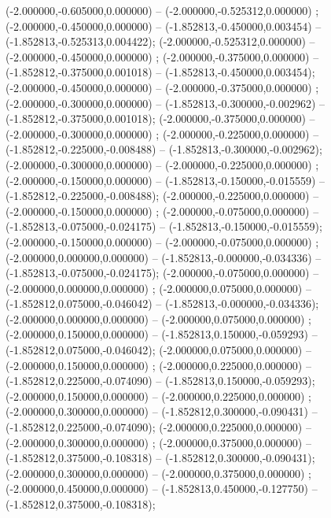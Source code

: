  (-2.000000,-0.605000,0.000000) -- (-2.000000,-0.525312,0.000000) ;
 (-2.000000,-0.450000,0.000000) -- (-1.852813,-0.450000,0.003454) -- (-1.852813,-0.525313,0.004422);
 (-2.000000,-0.525312,0.000000) -- (-2.000000,-0.450000,0.000000) ;
 (-2.000000,-0.375000,0.000000) -- (-1.852812,-0.375000,0.001018) -- (-1.852813,-0.450000,0.003454);
 (-2.000000,-0.450000,0.000000) -- (-2.000000,-0.375000,0.000000) ;
 (-2.000000,-0.300000,0.000000) -- (-1.852813,-0.300000,-0.002962) -- (-1.852812,-0.375000,0.001018);
 (-2.000000,-0.375000,0.000000) -- (-2.000000,-0.300000,0.000000) ;
 (-2.000000,-0.225000,0.000000) -- (-1.852812,-0.225000,-0.008488) -- (-1.852813,-0.300000,-0.002962);
 (-2.000000,-0.300000,0.000000) -- (-2.000000,-0.225000,0.000000) ;
 (-2.000000,-0.150000,0.000000) -- (-1.852813,-0.150000,-0.015559) -- (-1.852812,-0.225000,-0.008488);
 (-2.000000,-0.225000,0.000000) -- (-2.000000,-0.150000,0.000000) ;
 (-2.000000,-0.075000,0.000000) -- (-1.852813,-0.075000,-0.024175) -- (-1.852813,-0.150000,-0.015559);
 (-2.000000,-0.150000,0.000000) -- (-2.000000,-0.075000,0.000000) ;
 (-2.000000,0.000000,0.000000) -- (-1.852813,-0.000000,-0.034336) -- (-1.852813,-0.075000,-0.024175);
 (-2.000000,-0.075000,0.000000) -- (-2.000000,0.000000,0.000000) ;
 (-2.000000,0.075000,0.000000) -- (-1.852812,0.075000,-0.046042) -- (-1.852813,-0.000000,-0.034336);
 (-2.000000,0.000000,0.000000) -- (-2.000000,0.075000,0.000000) ;
 (-2.000000,0.150000,0.000000) -- (-1.852813,0.150000,-0.059293) -- (-1.852812,0.075000,-0.046042);
 (-2.000000,0.075000,0.000000) -- (-2.000000,0.150000,0.000000) ;
 (-2.000000,0.225000,0.000000) -- (-1.852812,0.225000,-0.074090) -- (-1.852813,0.150000,-0.059293);
 (-2.000000,0.150000,0.000000) -- (-2.000000,0.225000,0.000000) ;
 (-2.000000,0.300000,0.000000) -- (-1.852812,0.300000,-0.090431) -- (-1.852812,0.225000,-0.074090);
 (-2.000000,0.225000,0.000000) -- (-2.000000,0.300000,0.000000) ;
 (-2.000000,0.375000,0.000000) -- (-1.852812,0.375000,-0.108318) -- (-1.852812,0.300000,-0.090431);
 (-2.000000,0.300000,0.000000) -- (-2.000000,0.375000,0.000000) ;
 (-2.000000,0.450000,0.000000) -- (-1.852813,0.450000,-0.127750) -- (-1.852812,0.375000,-0.108318);

